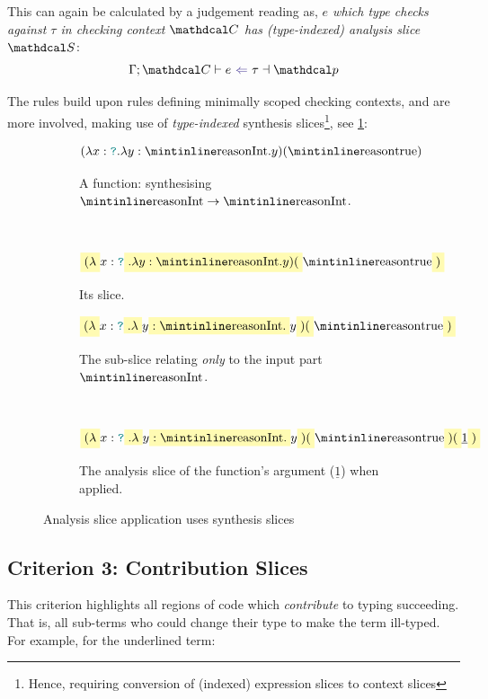 This can again be calculated by a judgement reading as, \textit{$e$ which type checks against $\tau$ in checking context $\C$ has (type-indexed) analysis slice $\S$}:
\[\analysisslice{\C}{e}{\tau}{\p}\]

The rules build upon rules defining minimally scoped checking contexts, and are more involved, making use of \textit{type-indexed} synthesis slices\footnote{Hence, requiring conversion of (indexed) expression slices to context slices}, see \cref{fig:AnalysisSliceApplication}:
\begin{figure}[h]
\centering
\begin{subfigure}{0.4\textwidth}
\[(\lambda x : \dyn. \lambda y : \code{Int}. y)(\code{true})\]
\caption{A function: synthesising $\code{Int} \to \code{Int}$.}
\end{subfigure}$\qquad$
\begin{subfigure}{0.4\textwidth}
\[\hlcmaths[yellow!30]{(\lambda} x : \dyn\hlcmaths[yellow!30]{. \lambda y : \code{Int}. y)(}\code{true}\hlcmaths[yellow!30]{)}\]
\caption{Its slice.}
\end{subfigure}
\begin{subfigure}{0.4\textwidth}
\[\hlcmaths[yellow!30]{(\lambda} x : \dyn\hlcmaths[yellow!30]{. \lambda} y \hlcmaths[yellow!30]{: \code{Int}.} y\hlcmaths[yellow!30]{)(}\code{true}\hlcmaths[yellow!30]{)}\]
\caption{The sub-slice relating \textit{only} to the input part $\code{Int}$.}
\end{subfigure}$\qquad$
\begin{subfigure}{0.4\textwidth}
\[\hlcmaths[yellow!30]{(\lambda} x : \dyn\hlcmaths[yellow!30]{. \lambda} y \hlcmaths[yellow!30]{: \code{Int}.} y\hlcmaths[yellow!30]{)(}\code{true}\hlcmaths[yellow!30]{)(}\underline{1}\hlcmaths[yellow!30]{)}\]
\caption{The analysis slice of the function's argument ($\underline{1}$) when applied.}
\end{subfigure}
\caption{Analysis slice application uses synthesis slices}
\label{fig:AnalysisSliceApplication}
\end{figure}

\subsection{Criterion 3: Contribution Slices}
\label{sec:ContributionSlices}
This criterion highlights all regions of code which \textit{contribute} to typing succeeding. That is, all sub-terms who could change their type to make the term ill-typed. For example, for the underlined term:

